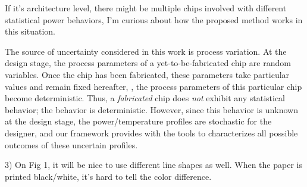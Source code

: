 \begin{reviewer}
If it’s architecture level, there might be multiple chips involved with different statistical power behaviors, I’m curious about how the proposed method works in this situation.
\end{reviewer}
\begin{authors}
The source of uncertainty considered in this work is process variation.
At the design stage, the process parameters of a yet-to-be-fabricated chip are random variables.
Once the chip has been fabricated, these parameters take particular values and remain fixed hereafter, \ie, the process parameters of this particular chip become deterministic.
Thus, a \emph{fabricated} chip does \emph{not} exhibit any statistical behavior; the behavior is deterministic.
However, since this behavior is unknown at the design stage, the power/temperature profiles are stochastic for the designer, and our framework provides with the tools to characterizes all possible outcomes of these uncertain profiles.

\end{authors}

\begin{reviewer}
3) On Fig 1, it will be nice to use different line shapes as well. When the paper is printed black/white, it’s hard to tell the color difference.
\end{reviewer}
\begin{authors}


\end{authors}
